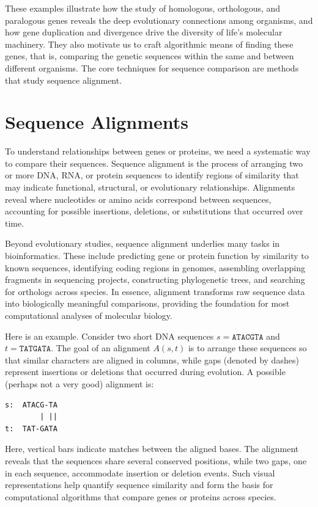 These examples illustrate how the study of homologous, orthologous, and paralogous genes reveals the deep evolutionary connections among organisms, and how gene duplication and divergence drive the diversity of life’s molecular machinery. They also motivate us to craft algorithmic means of finding these genes, that is, comparing the genetic sequences within the same and between different organisms. The core techniques for sequence comparison are methods that study sequence alignment.

\section{Sequence Alignments}

To understand relationships between genes or proteins, we need a systematic way to compare their sequences. Sequence alignment is the process of arranging two or more DNA, RNA, or protein sequences to identify regions of similarity that may indicate functional, structural, or evolutionary relationships. Alignments reveal where nucleotides or amino acids correspond between sequences, accounting for possible insertions, deletions, or substitutions that occurred over time. 

Beyond evolutionary studies, sequence alignment underlies many tasks in bioinformatics. These include predicting gene or protein function by similarity to known sequences, identifying coding regions in genomes, assembling overlapping fragments in sequencing projects, constructing phylogenetic trees, and searching for orthologs across species. In essence, alignment transforms raw sequence data into biologically meaningful comparisons, providing the foundation for most computational analyses of molecular biology.

Here is an example. Consider two short DNA sequences $s = \texttt{ATACGTA}$ and $t = \texttt{TATGATA}$. The goal of an alignment $A(s,t)$ is to arrange these sequences so that similar characters are aligned in columns, while gaps (denoted by dashes) represent insertions or deletions that occurred during evolution. A possible (perhaps not a very good) alignment is:

\begin{verbatim}
s:  ATACG-TA
        | ||
t:  TAT-GATA
\end{verbatim}

Here, vertical bars indicate matches between the aligned bases. The alignment reveals that the sequences share several conserved positions, while two gaps, one in each sequence, accommodate insertion or deletion events. Such visual representations help quantify sequence similarity and form the basis for computational algorithms that compare genes or proteins across species.

